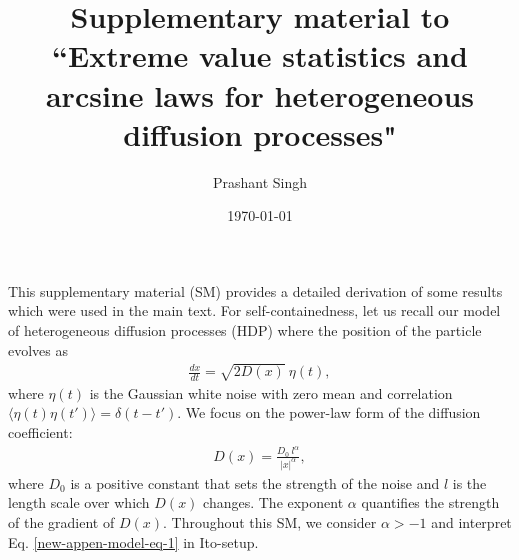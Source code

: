 \documentclass[superscriptaddress,amsmath,amssymb,aps,onecolumn]{revtex4}
\newcommand{\red}[1]{{\color[rgb]{1,0,0}{\protect{#1}}}}
\begin{document}
	
	
	
	\date{\today}
	\newcommand{\titlename}{Supplementary material to ``Extreme value statistics and arcsine laws for heterogeneous diffusion processes"}
	
	
	\title{\titlename}
	
\author{Prashant Singh}
\maketitle
	
	
This supplementary material (SM) provides a detailed derivation of some results which were used in the main text. For self-containedness, let us recall our model of heterogeneous diffusion processes (HDP) where the position of the particle evolves as
\begin{align}
\frac{dx}{dt} = \sqrt{2 D(x)} ~\eta(t),
\label{new-appen-model-eq-1}
\end{align}
where $\eta(t)$ is the Gaussian white noise with zero mean and correlation $\langle \eta(t) \eta(t') \rangle = \delta(t-t')$. We focus on the power-law form of the diffusion coefficient:
\begin{align}
D(x) =  \frac{D_0~l^{\alpha}}{|x|^{\alpha}},
\label{new-appen-extreme-eq-3}
\end{align}
where $D_0$ is a positive constant that sets the strength of the noise and $l$ is the length scale over which $D(x)$ changes. The exponent $\alpha$ quantifies the strength of the gradient of $D(x)$. Throughout this SM, we consider $\alpha >-1$ and interpret Eq. \eqref{new-appen-model-eq-1} in Ito-setup.
	
\end{document}
